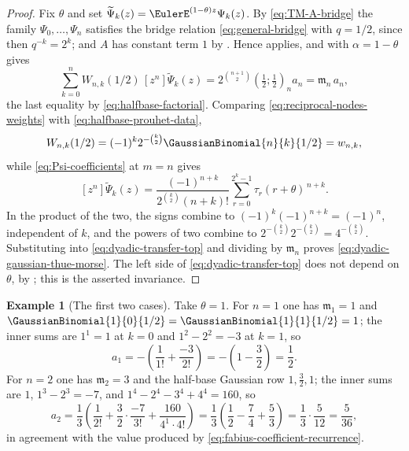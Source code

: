 \documentclass[11pt,a4paper,oneside,openany]{book}
\theoremstyle{definition}
\newtheorem{example}[example]{Example}
\theoremstyle{remark}
\begin{document}
\begin{proof}
Fix $\theta$ and set $\widetilde\Psi_k(z)=\EulerE^{(1-\theta)z}\Psi_k(z)$.  By \eqref{eq:TM-A-bridge} the family $\Psi_0,\ldots,\Psi_n$ satisfies the bridge relation \eqref{eq:general-bridge} with $q=1/2$, since then $q^{-k}=2^k$; and $A$ has constant term $1$ by .  Hence  applies, and  with $\alpha=1-\theta$ gives
\begin{equation}\label{eq:dyadic-transfer-top}
 \sum_{k=0}^{n}W_{n,k}(1/2)\,[z^n]\widetilde\Psi_k(z)
 =2^{\binom{n+1}{2}}\left(\tfrac12;\tfrac12\right)_n a_n
 =\mathfrak m_n\,a_n,
\end{equation}
the last equality by \eqref{eq:halfbase-factorial}.  Comparing \eqref{eq:reciprocal-nodes-weights} with \eqref{eq:halfbase-prouhet-data},
\[
 W_{n,k}(1/2)=(-1)^k2^{-\binom k2}\GaussianBinomial{n}{k}{1/2}=w_{n,k},
\]
while \eqref{eq:Psi-coefficients} at $m=n$ gives
\[
 [z^n]\widetilde\Psi_k(z)
 =\frac{(-1)^{n+k}}{2^{\binom k2}(n+k)!}
  \sum_{r=0}^{2^k-1}\tau_r(r+\theta)^{\,n+k}.
\]
In the product of the two, the signs combine to $(-1)^k(-1)^{n+k}=(-1)^n$, independent of $k$, and the powers of two combine to $2^{-\binom k2}2^{-\binom k2}=4^{-\binom k2}$.  Substituting into \eqref{eq:dyadic-transfer-top} and dividing by $\mathfrak m_n$ proves \eqref{eq:dyadic-gaussian-thue-morse}.  The left side of \eqref{eq:dyadic-transfer-top} does not depend on $\theta$, by ; this is the asserted invariance.
\end{proof}

\begin{example}[The first two cases]\label{ex:dyadic-formula-small}
Take $\theta=1$.  For $n=1$ one has $\mathfrak m_1=1$ and $\GaussianBinomial{1}{0}{1/2}=\GaussianBinomial{1}{1}{1/2}=1$; the inner sums are $1^1=1$ at $k=0$ and $1^2-2^2=-3$ at $k=1$, so
\[
 a_1=-\left(\frac{1}{1!}+\frac{-3}{2!}\right)=-\left(1-\frac32\right)=\frac12 .
\]
For $n=2$ one has $\mathfrak m_2=3$ and the half-base Gaussian row $1,\tfrac32,1$; the inner sums are $1$, $1^3-2^3=-7$, and $1^4-2^4-3^4+4^4=160$, so
\[
 a_2=\frac13\left(\frac{1}{2!}+\frac{3}{2}\cdot\frac{-7}{3!}
      +\frac{160}{4^1\cdot4!}\right)
    =\frac13\left(\frac12-\frac74+\frac53\right)
    =\frac13\cdot\frac5{12}=\frac5{36},
\]
in agreement with the value produced by \eqref{eq:fabius-coefficient-recurrence}.
\end{example}
\end{document}
